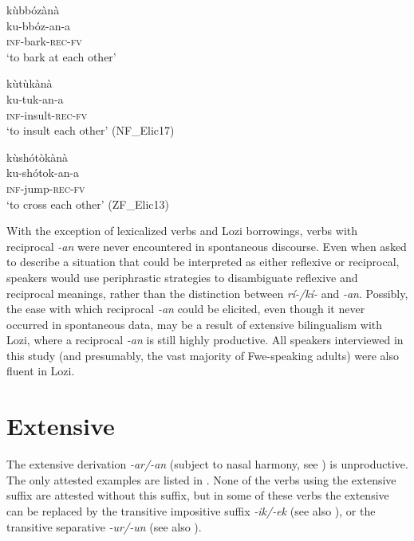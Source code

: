\ea
\glll kùbbózànà\\
ku-bbóz-an-a\\
\textsc{inf}-bark-\textsc{rec}-\textsc{fv}\\
\glt ‘to bark at each other’
\z

\ea
\glll kùtùkànà\\
ku-tuk-an-a\\
\textsc{inf}-insult-\textsc{rec}-\textsc{fv}\\
\glt ‘to insult each other’ (NF\_Elic17)
\z

\ea
\label{bkm:Ref74909222}
\glll kùshótòkànà\\
ku-shótok-an-a\\
\textsc{inf}-jump-\textsc{rec}-\textsc{fv}\\
\glt ‘to cross each other’ (ZF\_Elic13)
\z

With the exception of lexicalized verbs and Lozi borrowings, verbs with reciprocal \textit{-an} were never encountered in spontaneous discourse. Even when asked to describe a situation that could be interpreted as either reflexive or reciprocal, speakers would use periphrastic strategies to disambiguate reflexive and reciprocal meanings, rather than the distinction between \textit{rí-/kí-} and \textit{-an}. Possibly, the ease with which reciprocal \textit{-an} could be elicited, even though it never occurred in spontaneous data, may be a result of extensive bilingualism with Lozi, where a reciprocal \textit{-an} is still highly productive. All speakers interviewed in this study (and presumably, the vast majority of Fwe-speaking adults) were also fluent in Lozi.

\section{Extensive}
\label{bkm:Ref486253151}\hypertarget{Toc75352669}{}
The extensive derivation \textit{-ar/-an} (subject to nasal harmony, see ) is unproductive. The only attested examples are listed in . None of the verbs using the extensive suffix are attested without this suffix, but in some of these verbs the extensive can be replaced by the transitive impositive suffix \textit{-ik/-ek} (see also ), or the transitive separative \textit{-ur/-un} (see also ).

